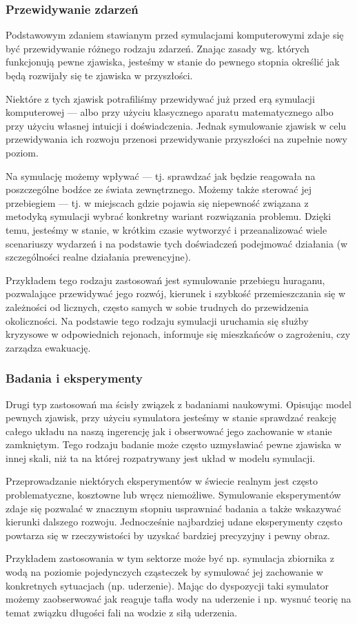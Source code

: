 \subsubsection{Przewidywanie zdarzeń}
\par{
Podstawowym zdaniem stawianym przed symulacjami komputerowymi zdaje się być przewidywanie różnego rodzaju zdarzeń. Znając zasady wg. których funkcjonują pewne zjawiska, jesteśmy w stanie do pewnego stopnia określić jak będą rozwijały się te zjawiska w przyszłości.
}
\par{
Niektóre z tych zjawisk potrafiliśmy przewidywać już przed erą symulacji komputerowej --- albo przy użyciu klasycznego aparatu matematycznego albo przy użyciu własnej intuicji i doświadczenia. Jednak symulowanie zjawisk w celu przewidywania ich rozwoju przenosi przewidywanie przyszłości na zupełnie nowy poziom.
}
\par{
Na symulację możemy wpływać --- tj. sprawdzać jak będzie reagowała na poszczególne bodźce ze świata zewnętrznego. Możemy także sterować jej przebiegiem --- tj. w miejscach gdzie pojawia się niepewność związana z metodyką symulacji wybrać konkretny wariant rozwiązania problemu.
Dzięki temu, jesteśmy w stanie, w krótkim czasie wytworzyć i przeanalizować wiele scenariuszy wydarzeń i na podstawie tych doświadczeń podejmować działania (w szczególności realne działania prewencyjne).
}
\par{
Przykładem tego rodzaju zastosowań jest symulowanie przebiegu huraganu, pozwalające przewidywać jego rozwój, kierunek i szybkość przemieszczania się w zależności od licznych, często samych w sobie trudnych do przewidzenia okoliczności. Na podstawie tego rodzaju symulacji uruchamia się służby kryzysowe w odpowiednich rejonach, informuje się mieszkańców o zagrożeniu, czy zarządza ewakuację.
}

\subsubsection{Badania i eksperymenty}
\par{
Drugi typ zastosowań ma ścisły związek z badaniami naukowymi.
Opisując model pewnych zjawisk, przy użyciu symulatora jesteśmy w stanie sprawdzać reakcję całego układu na naszą ingerencję jak i obserwować jego zachowanie w stanie zamkniętym. Tego rodzaju badanie może często uzmysławiać pewne zjawiska w innej skali, niż ta na której rozpatrywany jest układ w modelu symulacji.
}
\par{
Przeprowadzanie niektórych eksperymentów w świecie realnym jest często problematyczne, kosztowne lub wręcz niemożliwe. Symulowanie eksperymentów zdaje się pozwalać w znacznym stopniu usprawniać badania a także wskazywać kierunki dalszego rozwoju. Jednocześnie najbardziej udane eksperymenty często powtarza się w rzeczywistości by uzyskać bardziej precyzyjny i pewny obraz.
}
\par{
Przykładem zastosowania w tym sektorze może być np. symulacja zbiornika z wodą na poziomie pojedynczych cząsteczek by symulować jej zachowanie w konkretnych sytuacjach (np. uderzenie). Mając do dyspozycji taki symulator możemy zaobserwować jak reaguje tafla wody na uderzenie i np. wysnuć teorię na temat związku długości fali na wodzie z siłą uderzenia.
}

